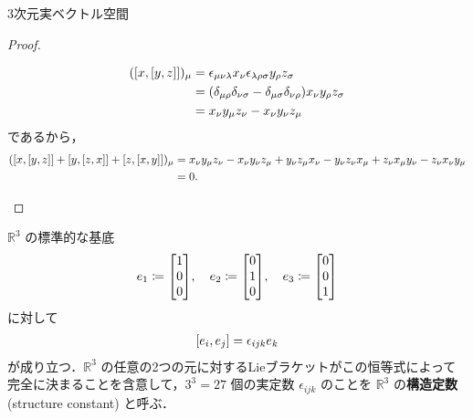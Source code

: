 \documentclass[rep_main]{subfiles}
\begin{document}
\begin{myexample}[label=ex:R3-LieAlg]{3次元実ベクトル空間}
\begin{proof}
\begin{description}
\begin{align}
                (\comm{x}{\comm{y}{z}})_\mu &= \epsilon_{\mu\nu\lambda} x_\nu \epsilon_{\lambda\rho\sigma} y_\rho z_\sigma \\
                &= (\delta_{\mu\rho}\delta_{\nu \sigma} - \delta_{\mu\sigma} \delta_{\nu\rho}) x_\nu y_\rho z_\sigma \\
                &= x_\nu y_\mu z_\nu - x_\nu y_\nu z_\mu
            \end{align}
            であるから，
            \begin{align}
                (\comm{x}{\comm{y}{z}} + \comm{y}{\comm{z}{x}} + \comm{z}{\comm{x}{y}})_\mu 
                &= x_\nu y_\mu z_\nu - x_\nu y_\nu z_\mu + y_\nu z_\mu x_\nu - y_\nu z_\nu x_\mu + z_\nu x_\mu y_\nu - z_\nu x_\nu y_\mu \\
                &= 0.
            \end{align}
        \end{description}
    \end{proof}
    $\mathbb{R}^3$ の標準的な基底
    \begin{align}
        e_1 \coloneqq \mqty[1 \\ 0 \\ 0],\quad e_2 \coloneqq \mqty[0 \\ 1 \\ 0],\quad e_3 \coloneqq \mqty[0 \\ 0 \\ 1]
    \end{align}
    に対して
    \begin{align}
        \comm{e_i}{e_j} = \epsilon_{ijk} e_k
    \end{align}
    が成り立つ．$\mathbb{R}^3$ の任意の2つの元に対するLieブラケットがこの恒等式によって完全に決まることを含意して，$3^3 = 27$ 個の実定数 $\epsilon_{ijk}$ のことを $\mathbb{R}^3$ の\textbf{構造定数} (structure constant) と呼ぶ．
\end{myexample}
\end{document}
